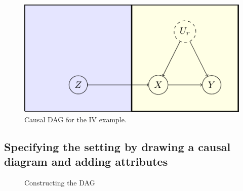\begin{figure}

{\centering \includegraphics[width=1\linewidth]{causaloptim-paper_files/figure-latex/iv-fig-1} 

}

\caption{Causal DAG for the IV example.}\label{fig:iv-fig}
\end{figure}

\hypertarget{specifying-the-setting-by-drawing-a-causal-diagram-and-adding-attributes}{%
\subsection{Specifying the setting by drawing a causal diagram and adding attributes}\label{specifying-the-setting-by-drawing-a-causal-diagram-and-adding-attributes}}

\begin{figure}
\caption{Constructing the DAG}\label{fig:DAG}
\end{figure}


